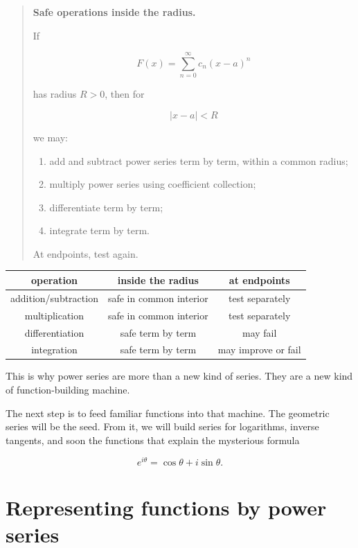 \begin{quote}
\textbf{Safe operations inside the radius.}

If

\[
F(x)=\sum_{n=0}^{\infty} c_n(x-a)^n
\]

has radius \(R>0\), then for

\[
|x-a|<R
\]

we may:

\begin{enumerate}
\item add and subtract power series term by term, within a common radius;

\item multiply power series using coefficient collection;

\item differentiate term by term;

\item integrate term by term.
\end{enumerate}

At endpoints, test again.
\end{quote}

\begin{center}
\begin{tabular}{c|c|c}
\textbf{operation} & \textbf{inside the radius} & \textbf{at endpoints} \\ \hline
addition/subtraction & safe in common interior & test separately \\
multiplication & safe in common interior & test separately \\
differentiation & safe term by term & may fail \\
integration & safe term by term & may improve or fail
\end{tabular}
\end{center}

This is why power series are more than a new kind of series.  They are a new kind of
function-building machine.

The next step is to feed familiar functions into that machine.  The geometric series will
be the seed.  From it, we will build series for logarithms, inverse tangents, and soon
the functions that explain the mysterious formula

\[
e^{i\theta}=\cos\theta+i\sin\theta.
\]

\section{Representing functions by power series}
\label{sec:representing-functions-power-series}

